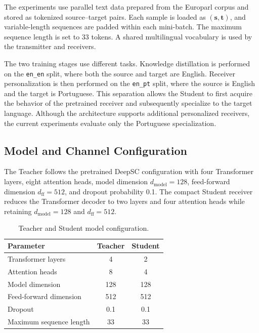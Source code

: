 \documentclass[conference]{IEEEtran}
\begin{document}
The experiments use parallel text data prepared from the Europarl corpus and stored as tokenized source--target pairs. Each sample is loaded as $(\mathbf{s},\mathbf{t})$, and variable-length sequences are padded within each mini-batch. The maximum sequence length is set to 33 tokens. A shared multilingual vocabulary is used by the transmitter and receivers.

The two training stages use different tasks. Knowledge distillation is performed on the \texttt{en\_en} split, where both the source and target are English. Receiver personalization is then performed on the \texttt{en\_pt} split, where the source is English and the target is Portuguese. This separation allows the Student to first acquire the behavior of the pretrained receiver and subsequently specialize to the target language. Although the architecture supports additional personalized receivers, the current experiments evaluate only the Portuguese specialization.

\subsection{Model and Channel Configuration}

The Teacher follows the pretrained DeepSC configuration with four Transformer layers, eight attention heads, model dimension $d_{\mathrm{model}}=128$, feed-forward dimension $d_{\mathrm{ff}}=512$, and dropout probability 0.1. The compact Student receiver reduces the Transformer decoder to two layers and four attention heads while retaining $d_{\mathrm{model}}=128$ and $d_{\mathrm{ff}}=512$.

\begin{table}[t]
    \centering
    \caption{Teacher and Student model configuration.}
    \label{tab:model-config}
    \small
    \begin{tabular}{lcc}
        \toprule
        Parameter & Teacher & Student \\
        \midrule
        Transformer layers & 4 & 2 \\
        Attention heads & 8 & 4 \\
        Model dimension & 128 & 128 \\
        Feed-forward dimension & 512 & 512 \\
        Dropout & 0.1 & 0.1 \\
        Maximum sequence length & 33 & 33 \\
        \bottomrule
    \end{tabular}
\end{table}
\end{document}
